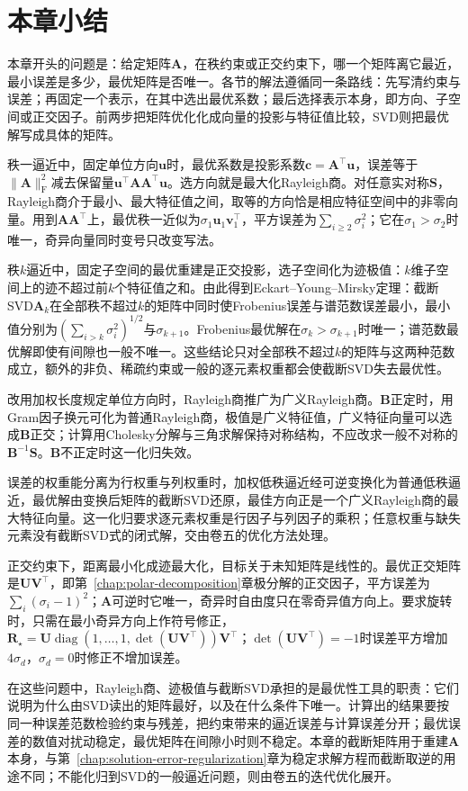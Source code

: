 \FloatBarrier
\section{本章小结}
\label{sec:matrix-approximation-summary}

本章开头的问题是：给定矩阵$\bm A$，在秩约束或正交约束下，哪一个矩阵离它最近，最小误差是多少，最优矩阵是否唯一。各节的解法遵循同一条路线：先写清约束与误差；再固定一个表示，在其中选出最优系数；最后选择表示本身，即方向、子空间或正交因子。前两步把矩阵优化化成向量的投影与特征值比较，SVD则把最优解写成具体的矩阵。

秩一逼近中，固定单位方向$\bm u$时，最优系数是投影系数$\bm c=\bm A^\top\bm u$，误差等于$\lVert\bm A\rVert_{\mathrm F}^2$减去保留量$\bm u^\top\bm A\bm A^\top\bm u$。选方向就是最大化Rayleigh商。对任意实对称$\bm S$，Rayleigh商介于最小、最大特征值之间，取等的方向恰是相应特征空间中的非零向量。用到$\bm A\bm A^\top$上，最优秩一近似为$\sigma_1\bm u_1\bm v_1^\top$，平方误差为$\sum_{i\geq2}\sigma_i^2$；它在$\sigma_1>\sigma_2$时唯一，奇异向量同时变号只改变写法。

秩$k$逼近中，固定子空间的最优重建是正交投影，选子空间化为迹极值：$k$维子空间上的迹不超过前$k$个特征值之和。由此得到Eckart--Young--Mirsky定理：截断SVD$\bm A_k$在全部秩不超过$k$的矩阵中同时使Frobenius误差与谱范数误差最小，最小值分别为$(\sum_{i>k}\sigma_i^2)^{1/2}$与$\sigma_{k+1}$。Frobenius最优解在$\sigma_k>\sigma_{k+1}$时唯一；谱范数最优解即使有间隙也一般不唯一。这些结论只对全部秩不超过$k$的矩阵与这两种范数成立，额外的非负、稀疏约束或一般的逐元素权重都会使截断SVD失去最优性。

改用加权长度规定单位方向时，Rayleigh商推广为广义Rayleigh商。$\bm B$正定时，用Gram因子换元可化为普通Rayleigh商，极值是广义特征值，广义特征向量可以选成$\bm B$正交；计算用Cholesky分解与三角求解保持对称结构，不应改求一般不对称的$\bm B^{-1}\bm S$。$\bm B$不正定时这一化归失效。

误差的权重能分离为行权重与列权重时，加权低秩逼近经可逆变换化为普通低秩逼近，最优解由变换后矩阵的截断SVD还原，最佳方向正是一个广义Rayleigh商的最大特征向量。这一化归要求逐元素权重是行因子与列因子的乘积；任意权重与缺失元素没有截断SVD式的闭式解，交由卷五的优化方法处理。

正交约束下，距离最小化成迹最大化，目标关于未知矩阵是线性的。最优正交矩阵是$\bm U\bm V^\top$，即第~\ref{chap:polar-decomposition}章极分解的正交因子，平方误差为$\sum_i(\sigma_i-1)^2$；$\bm A$可逆时它唯一，奇异时自由度只在零奇异值方向上。要求旋转时，只需在最小奇异方向上作符号修正，$\bm R_\star=\bm U\operatorname{diag}(1,\ldots,1,\det(\bm U\bm V^\top))\bm V^\top$；$\det(\bm U\bm V^\top)=-1$时误差平方增加$4\sigma_d$，$\sigma_d=0$时修正不增加误差。

在这些问题中，Rayleigh商、迹极值与截断SVD承担的是最优性工具的职责：它们说明为什么由SVD读出的矩阵最好，以及在什么条件下唯一。计算出的结果要按同一种误差范数检验约束与残差，把约束带来的逼近误差与计算误差分开；最优误差的数值对扰动稳定，最优矩阵在间隙小时则不稳定。本章的截断矩阵用于重建$\bm A$本身，与第~\ref{chap:solution-error-regularization}章为稳定求解方程而截断取逆的用途不同；不能化归到SVD的一般逼近问题，则由卷五的迭代优化展开。
